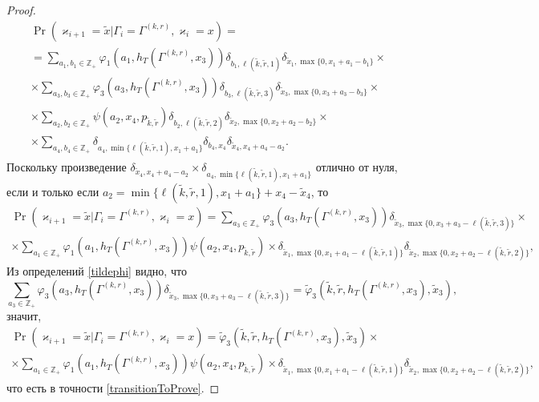 \documentclass[a4paper,12pt,russian]{extarticle}
\begin{document}
\begin{proof}
\begin{multline*}
\Pr (\varkappa_{i+1}=\tilde{x}|\Gamma_{i}=\Gamma^{(k,r)},\varkappa_i=x)= \\
=\sum_{a_1,b_1 \in \mathbb{Z}_+} \varphi_1(a_1,h_T(\Gamma^{(k,r)},x_3)) \delta_{b_1,\ell(\tilde{k},\tilde{r},1)} \delta_{\tilde{x}_1,\max{\{0,x_1+a_1-b_1\}}} \times \\
\times \sum_{a_3,b_3 \in \mathbb{Z}_+}  \varphi_3(a_3,h_T(\Gamma^{(k,r)},x_3)) \delta_{b_3,\ell(\tilde{k},\tilde{r},3)}  \delta_{\tilde{x}_3,\max{\{0,x_3+a_3-b_3\}}} \times \\
\times \sum_{a_2,b_2 \in \mathbb{Z}_+}  \psi(a_2,x_4, p_{\tilde{k},\tilde{r}})   \delta_{b_2,\ell(\tilde{k},\tilde{r},2)}   \delta_{\tilde{x}_2,\max{\{0,x_2+a_2-b_2\}}} \times \\
\times \sum_{a_4,b_4 \in \mathbb{Z}_+}  \delta_{a_4,\min{\{\ell(\tilde{k},\tilde{r},1), x_1+a_1}\}}   \delta_{b_4,x_4} \delta_{\tilde{x}_4,x_4+a_4-a_2}.
\end{multline*}
Поскольку произведение $\delta_{\tilde{x}_4,x_4+a_4-a_2}\times \delta_{a_4,\min{\{\ell(\tilde{k},\tilde{r},1), x_1+a_1}\}}$ отлично от нуля, если и только если $a_2 = \min{\{\ell(\tilde{k},\tilde{r},1), x_1+a_1}\} +x_4-\tilde{x}_4$, то
\begin{multline*}
\Pr (\varkappa_{i+1}=\tilde{x}|\Gamma_{i}=\Gamma^{(k,r)},\varkappa_i=x)=\sum_{a_3\in \mathbb{Z}_+}  \varphi_3(a_3,h_T(\Gamma^{(k,r)},x_3))  \delta_{\tilde{x}_3,\max{\{0,x_3+a_3-\ell(\tilde{k},\tilde{r},3)\}}} \times \\
\times\sum_{a_1 \in \mathbb{Z}_+} \varphi_1(a_1,h_T(\Gamma^{(k,r)},x_3))  \psi(a_2,x_4, p_{\tilde{k},\tilde{r}}) \times  \delta_{\tilde{x}_1,\max{\{0,x_1+a_1-\ell(\tilde{k},\tilde{r},1)\}}}  \delta_{\tilde{x}_2,\max{\{0,x_2+a_2-\ell(\tilde{k},\tilde{r},2)\}}},
\end{multline*}
Из определений \eqref{tildephi} видно, что
\begin{equation*}
\sum_{a_3\in \mathbb{Z}_+}  \varphi_3(a_3,h_T(\Gamma^{(k,r)},x_3))  \delta_{\tilde{x}_3,\max{\{0,x_3+a_3-\ell(\tilde{k},\tilde{r},3)\}}} = \tilde{\varphi}_3(\tilde{k},\tilde{r},h_T(\Gamma^{(k,r)},x_3),\tilde{x}_3),
\end{equation*}
значит,
\begin{multline*}
\Pr (\varkappa_{i+1}=\tilde{x}|\Gamma_{i}=\Gamma^{(k,r)},\varkappa_i=x)
=\tilde{\varphi}_3(\tilde{k},\tilde{r},h_T(\Gamma^{(k,r)},x_3),\tilde{x}_3) \times\\
\times \sum_{a_1 \in \mathbb{Z}_+} \varphi_1(a_1,h_T(\Gamma^{(k,r)},x_3))  \psi(a_2,x_4, p_{\tilde{k},\tilde{r}}) \times \delta_{\tilde{x}_1,\max{\{0,x_1+a_1-\ell(\tilde{k},\tilde{r},1)\}}}  \delta_{\tilde{x}_2,\max{\{0,x_2+a_2-\ell(\tilde{k},\tilde{r},2)\}}},
\end{multline*}
что есть в точности \eqref{transitionToProve}.
\end{proof}
\end{document}
